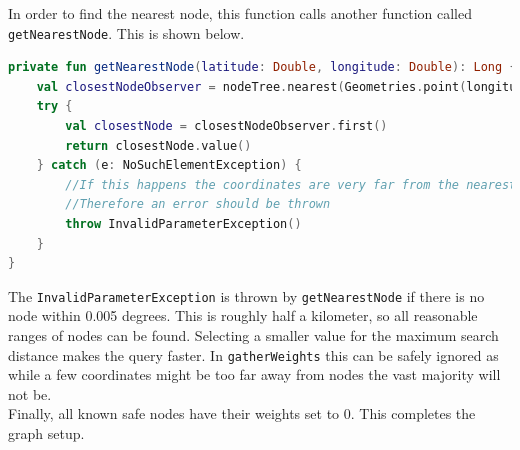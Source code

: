 \documentclass[11pt,twoside,a4paper]{article}
\begin{document}
In order to find the nearest node, this function calls another function called \texttt{getNearestNode}. This is shown below.
\begin{lstlisting}[language=kotlin]
private fun getNearestNode(latitude: Double, longitude: Double): Long {
    val closestNodeObserver = nodeTree.nearest(Geometries.point(longitude, latitude), 0.005, 1)
    try {
        val closestNode = closestNodeObserver.first()
        return closestNode.value()
    } catch (e: NoSuchElementException) {
        //If this happens the coordinates are very far from the nearest node, so a appropriate node cannot be found.
        //Therefore an error should be thrown
        throw InvalidParameterException()
    }
}
\end{lstlisting}
The \texttt{InvalidParameterException} is thrown by \texttt{getNearestNode} if there is no node within 0.005 degrees. This is roughly half a kilometer, so all reasonable ranges of nodes can be found. Selecting a smaller value for
 the maximum search distance makes the query faster. In \texttt{gatherWeights} this can be safely ignored as while a few coordinates might be too far away from nodes the vast majority will not be.\\
Finally, all known safe nodes have their weights set to 0. This completes the graph setup.
\end{document}
